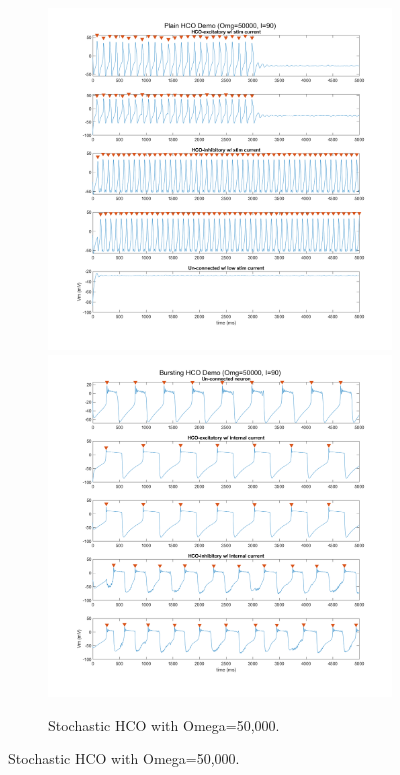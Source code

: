 \documentclass[
]{article}
\begin{document}
\begin{figure} \ContinuedFloat
  \centering
  \begin{subfigure}[b]{\textwidth}  
    \includegraphics[width=.49\textwidth]{figs/old/Fx1_B_HCO_Om5e4_NB.png}
    \includegraphics[width=.49\textwidth]{figs/old/Fx1_B_HCO_Om5e4_B.png}
    \vspace{-0.5cm} \caption{Stochastic HCO with Omega=50,000.}
  \end{subfigure}
\end{figure}
\end{document}
